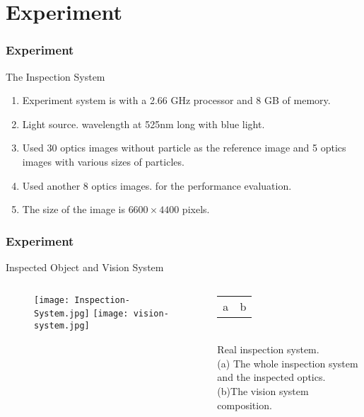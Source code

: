 \documentclass[14pt,hyperref={CJKbookmarks=true}]{beamer}
\theoremstyle{plain}
\theoremstyle{definition}
\theoremstyle{remark}
\begin{document}
\section{Experiment}
\begin{frame}
\frametitle{Experiment}
\begin{block}{The Inspection System}
\begin{enumerate}
\item Experiment system is with a 2.66 GHz processor and 8 GB of memory.
\item Light source.  wavelength at 525nm long with blue light.
\item Used 30 optics images without particle as the reference image and 5 optics images with various sizes of particles. 
\item Used another 8 optics images. for the performance evaluation.
\item The size of the image is $6600\times4400$ pixels.
\end{enumerate}
\end{block}
\end{frame}
\begin{frame}
\frametitle{Experiment}{Inspected Object and Vision System}
\begin{columns}[onlytextwidth]
\begin{column}{0.8\textwidth}
\begin{figure}
\texttt{[image: Inspection-System.jpg]}
\texttt{[image: vision-system.jpg]}
\end{figure}
\end{column}
\begin{column}{0.2\textwidth}
\scriptsize
\begin{tabular}{c|c}
a&b
\end{tabular}\\
Real inspection system.  \\
(a) The whole inspection system and the inspected optics.  \\
(b)The vision system composition.
\end{column}
\end{columns}
\end{frame}
\end{document}
